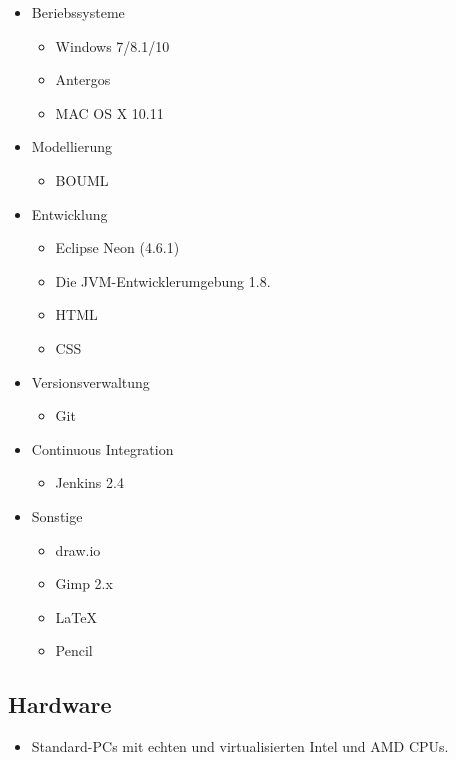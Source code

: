 \documentclass[parskip=full]{scrartcl}
\begin{document}
				\begin{itemize}
					\item Beriebssysteme
						\begin{itemize}
							\item Windows 7/8.1/10
							\item Antergos
							\item MAC OS X 10.11
						\end{itemize}
					\item Modellierung
						\begin{itemize}
							\item BOUML
						\end{itemize}
					\item Entwicklung
						\begin{itemize}
							\item Eclipse Neon (4.6.1)
							\item Die \gls{JVM}-Entwicklerumgebung 1.8.
							\item \gls{HTML}
							\item \gls{CSS}
						\end{itemize}
					\item Versionsverwaltung
						\begin{itemize}
							\item Git
						\end{itemize}
					\item Continuous Integration
						\begin{itemize}
							\item \gls{Jenkins} 2.4
						\end{itemize}
					\item Sonstige
						\begin{itemize}
							\item \gls{draw.io}
							\item \gls{Gimp} 2.x
							\item \LaTeX
								\item \gls{Pencil}
						\end{itemize}
				\end{itemize}
	
		\subsection{Hardware}

			\begin{itemize}
				\item Standard-PCs mit echten und virtualisierten Intel und AMD CPUs.
			\end{itemize}
	
\end{document}
